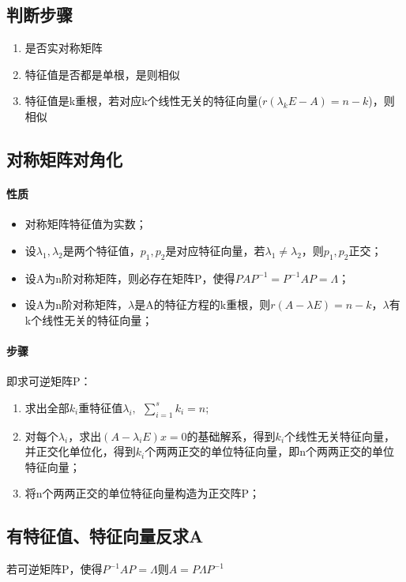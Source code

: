 \subsection{判断步骤}
\begin{enumerate}
    \item 是否实对称矩阵
    \item 特征值是否都是单根，是则相似
    \item 特征值是k重根，若对应k个线性无关的特征向量(\(r(\lambda_kE - A) = n - k\))，则相似
\end{enumerate}


\subsection{对称矩阵对角化}
\paragraph{性质}
\begin{itemize}
    \item 对称矩阵特征值为实数；
    \item 设\(\lambda_1, \lambda_2\)是两个特征值，\(p_1, p_2\)是对应特征向量，若\(\lambda_1 \neq \lambda_2\)，则\(p_1,p_2\)正交；
    \item 设A为n阶对称矩阵，则必存在矩阵P，使得\(PAP^{-1} = P^{-1}AP = \Lambda\)；
    \item 设A为n阶对称矩阵，\(\lambda\)是A的特征方程的k重根，则\(r(A - \lambda E) = n - k\)，\(\lambda\)有k个线性无关的特征向量；
\end{itemize}


\paragraph{步骤}
即求可逆矩阵P：
\begin{enumerate}
    \item 求出全部\(k_i\)重特征值\(\lambda_i,\ \ \displaystyle\sum_{i = 1}^s k_i = n\);
    \item 对每个\(\lambda_i\)，求出\((A - \lambda_iE)x = 0\)的基础解系，得到\(k_i\)个线性无关特征向量，并正交化单位化，得到\(k_i\)个两两正交的单位特征向量，即n个两两正交的单位特征向量；
    \item 将n个两两正交的单位特征向量构造为正交阵P；
\end{enumerate}

\subsection{有特征值、特征向量反求A}
若可逆矩阵P，使得\(P^{-1}AP = \Lambda\)则\(A = P\Lambda P^{-1}\)

